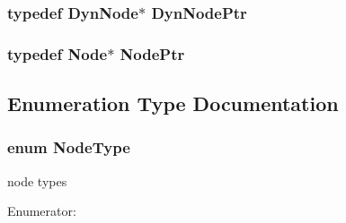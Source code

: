 \subsubsection{\setlength{\rightskip}{0pt plus 5cm}typedef {\bf DynNode}$\ast$ {\bf DynNodePtr}}\label{node_8h_d13c0b1025cf024eaf8455f8dd6a6870}


\subsubsection{\setlength{\rightskip}{0pt plus 5cm}typedef {\bf Node}$\ast$ {\bf NodePtr}}\label{node_8h_b8a1c102575e62c710f41f7384afa8eb}




\subsection{Enumeration Type Documentation}
\subsubsection{\setlength{\rightskip}{0pt plus 5cm}enum {\bf NodeType}}\label{node_8h_4c2ae9946037ced99faf5d86f9c2d53d}


node types 

\begin{Desc}
\item[Enumerator: ]\par
\begin{description}
\item[{\em 
VARIABLE\label{node_8h_4c2ae9946037ced99faf5d86f9c2d53dcbded3caf3f036b0f915e9593f0c67d2}
}]\item[{\em 
FACTOR\label{node_8h_4c2ae9946037ced99faf5d86f9c2d53d500b1145d8ce7b3a008a7ce6e229fe2d}
}]\item[{\em 
REGION\label{node_8h_4c2ae9946037ced99faf5d86f9c2d53d0553a0b8b3da967f4fee598fea816d1f}
}]\end{description}
\end{Desc}


